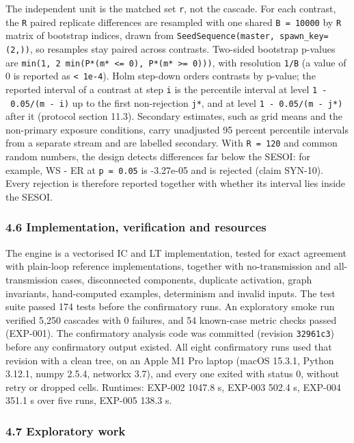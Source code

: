\documentclass[
]{article}
\begin{document}
The independent unit is the matched set \texttt{r}, not the cascade. For
each contrast, the \texttt{R} paired replicate differences are resampled
with one shared \texttt{B\ =\ 10000} by \texttt{R} matrix of bootstrap
indices, drawn from \texttt{SeedSequence(master,\ spawn\_key=(2,))}, so
resamples stay paired across contrasts. Two-sided bootstrap p-values are
\texttt{min(1,\ 2\ min(P*(m*\ \textless{}=\ 0),\ P*(m*\ \textgreater{}=\ 0)))},
with resolution \texttt{1/B} (a value of 0 is reported as
\texttt{\textless{}\ 1e-4}). Holm step-down orders contrasts by p-value;
the reported interval of a contrast at step \texttt{i} is the percentile
interval at level \texttt{1\ -\ 0.05/(m\ -\ i)} up to the first
non-rejection \texttt{j*}, and at level \texttt{1\ -\ 0.05/(m\ -\ j*)}
after it (protocol section 11.3). Secondary estimates, such as grid
means and the non-primary exposure conditions, carry unadjusted 95
percent percentile intervals from a separate stream and are labelled
secondary. With \texttt{R\ =\ 120} and common random numbers, the design
detects differences far below the SESOI: for example, WS - ER at
\texttt{p\ =\ 0.05} is -3.27e-05 and is rejected (claim SYN-10). Every
rejection is therefore reported together with whether its interval lies
inside the SESOI.

\subsubsection{4.6 Implementation, verification and
resources}\label{implementation-verification-and-resources}

The engine is a vectorised IC and LT implementation, tested for exact
agreement with plain-loop reference implementations, together with
no-transmission and all-transmission cases, disconnected components,
duplicate activation, graph invariants, hand-computed examples,
determinism and invalid inputs. The test suite passed 174 tests before
the confirmatory runs. An exploratory smoke run verified 5,250 cascades
with 0 failures, and 54 known-case metric checks passed (EXP-001). The
confirmatory analysis code was committed (revision \texttt{32961c3})
before any confirmatory output existed. All eight confirmatory runs used
that revision with a clean tree, on an Apple M1 Pro laptop (macOS
15.3.1, Python 3.12.1, numpy 2.5.4, networkx 3.7), and every one exited
with status 0, without retry or dropped cells. Runtimes: EXP-002 1047.8
s, EXP-003 502.4 s, EXP-004 351.1 s over five runs, EXP-005 138.3 s.

\subsubsection{4.7 Exploratory work}\label{exploratory-work}
\end{document}
